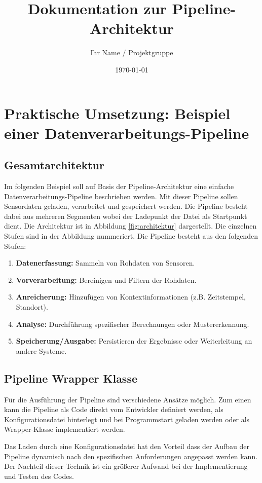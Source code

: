 \documentclass[a4paper]{article} %
\title{Dokumentation zur Pipeline-Architektur}
\author{Ihr Name / Projektgruppe}
\date{\today}
\begin{document}
\maketitle %
\tableofcontents %
\newpage

\section{Praktische Umsetzung: Beispiel einer Datenverarbeitungs-Pipeline}
\subsection{Gesamtarchitektur}
Im folgenden Beispiel soll auf Basis der Pipeline-Architektur eine einfache Datenverarbeitungs-Pipeline beschrieben werden. Mit dieser Pipeline sollen Sensordaten geladen, verarbeitet und gespeichert werden. Die Pipeline besteht dabei aus mehreren Segmenten wobei der Ladepunkt der Datei als Startpunkt dient.
Die Architektur ist in Abbildung \ref{fig:architektur} dargestellt. Die einzelnen Stufen sind in der Abbildung nummeriert.
Die Pipeline besteht aus den folgenden Stufen:
\begin{enumerate}
    \item \textbf{Datenerfassung:} Sammeln von Rohdaten von Sensoren.
    \item \textbf{Vorverarbeitung:} Bereinigen und Filtern der Rohdaten.
    \item \textbf{Anreicherung:} Hinzufügen von Kontextinformationen (z.B. Zeitstempel, Standort).
    \item \textbf{Analyse:} Durchführung spezifischer Berechnungen oder Mustererkennung.
    \item \textbf{Speicherung/Ausgabe:} Persistieren der Ergebnisse oder Weiterleitung an andere Systeme.
\end{enumerate}
\blindtext[3]
\lipsum[8-10]

\subsection{Pipeline Wrapper Klasse}
Für die Ausführung der Pipeline sind verschiedene Ansätze möglich. Zum einen kann die Pipeline als Code direkt vom Entwickler definiert werden, als Konfigurationsdatei hinterlegt und bei Programmstart geladen werden oder als Wrapper-Klasse implementiert werden.

Das Laden durch eine Konfigurationsdatei hat den Vorteil dass der Aufbau der Pipeline dynamisch nach den spezifischen Anforderungen angepasst werden kann. Der Nachteil dieser Technik ist ein größerer Aufwand bei der Implementierung und Testen des Codes.
\end{document}
